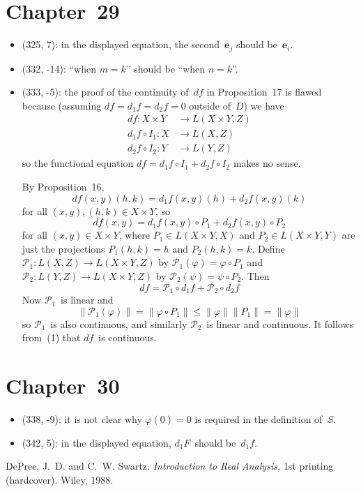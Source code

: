 \documentclass[letterpaper,12pt]{article}
\renewcommand{\P}{\mathcal{P}}
\newcommand{\after}{\circ}
\newcommand{\norm}[1]{\lVert{#1}\rVert}
\renewcommand{\vec}[1]{\boldsymbol{#1}}
\newcommand{\df}{d\!f}
\begin{document}
\section*{Chapter~29}
\begin{itemize}
\item (325, 7): in the displayed equation, the second~\(\vec{e}_j\) should be~\(\vec{e}_i\).
\item (332, -14): ``when \(m=k\)'' should be ``when \(n=k\)''.
\item (333, -5): the proof of the continuity of~\(\df\) in Proposition~17 is flawed because (assuming \(\df=d_1f=d_2f=0\) outside of~\(D\)) we have
\begin{align*}
\df:X\times Y&\to L(X\times Y,Z)\\
d_1f\after I_1:X&\to L(X,Z)\\
d_2f\after I_2:Y&\to L(Y,Z)
\end{align*}
so the functional equation \(\df=d_1f\after I_1+d_2f\after I_2\) makes no sense.

By Proposition~16,
\[\df(x,y)(h,k)=d_1f(x,y)(h)+d_2f(x,y)(k)\]
for all \((x,y),(h,k)\in X\times Y\), so
\[\df(x,y)=d_1f(x,y)\after P_1+d_2f(x,y)\after P_2\]
for all \((x,y)\in X\times Y\), where \(P_1\in L(X\times Y,X)\) and \(P_2\in L(X\times Y,Y)\) are just the projections \(P_1(h,k)=h\) and \(P_2(h,k)=k\). Define \(\P_1:L(X,Z)\to L(X\times Y,Z)\) by \(\P_1(\varphi)=\varphi\after P_1\) and \(\P_2:L(Y,Z)\to L(X\times Y,Z)\) by \(\P_2(\psi)=\psi\after P_2\). Then
\[\df=\P_1\after d_1f+\P_2\after d_2f\tag{1}\]
Now \(\P_1\)~is linear and
\[\norm{\P_1(\varphi)}=\norm{\varphi\after P_1}\le\norm{\varphi}\norm{P_1}=\norm{\varphi}\]
so \(\P_1\)~is also continuous, and similarly \(\P_2\)~is linear and continuous. It follows from~(1) that \(\df\)~is continuous.
\end{itemize}

\section*{Chapter~30}
\begin{itemize}
\item (338, -9): it is not clear why \(\varphi(0)=0\) is required in the definition of~\(S\).
\item (342, 5): in the displayed equation, \(d_1F\)~should be~\(d_1f\).
\end{itemize}

\begin{thebibliography}{0}
 DePree, J.~D. and C.~W. Swartz. \textit{Introduction to Real Analysis,} 1st printing (hardcover). Wiley, 1988.
\end{thebibliography}
\end{document}

